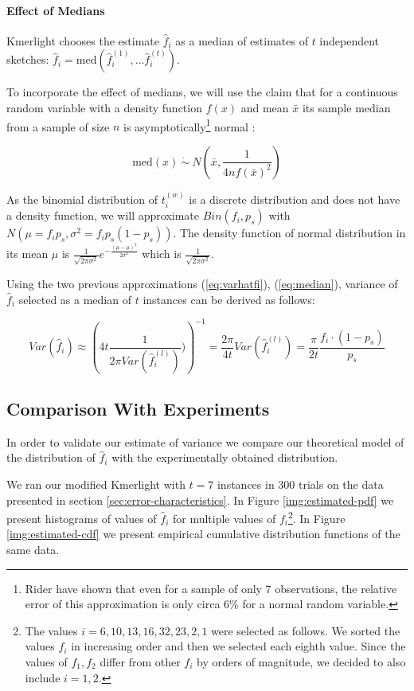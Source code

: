 \paragraph{Effect of Medians}
Kmerlight chooses the estimate $\hat f_i$ as a median of estimates of $t$ 
independent sketches: $\hat f_i = \mathrm{med}(\hat f_i^{(1)}, \dots \hat f_i^{(t)})$.

To incorporate the effect of medians, we will use the claim that for a continuous random
variable with a density function $f(x)$ and mean $\bar x$ its sample median from a sample of
size $n$ is asymptotically\footnote{Rider \cite{Rider1960} have shown that 
even for a sample of only $7$ observations, the relative error of this approximation is only
circa 6\% for a normal random variable.} normal \cite{WikiMedian}:

\begin{equation} \label{eq:median}
\mathrm{med}(x) ~\dot\sim~ N\left(\bar x, \frac{1}{4nf(\bar x)^2}\right)
\end{equation}

As the binomial distribution of $t_i^{(w)}$ is a discrete distribution and does
not have a density function, we will approximate $Bin(f_i, p_s)$ with
$N(\mu = f_i p_s, \sigma^2 = f_i p_s(1-p_s))$. The density function of normal distribution
in its mean $\mu$ is $\frac{1}{\sqrt{2\pi\sigma^2}} e^{-\frac{(\mu - \mu)^2}{2\sigma^2}}$
which is $\frac{1}{\sqrt{2\pi\sigma^2}}$.

Using the two previous approximations (\ref{eq:varhatfi}), (\ref{eq:median}), 
variance of $\hat f_i$ selected as a median of $t$ instances can be derived as follows:

\begin{equation} \label{eq:variance}
Var(\hat f_i) \approx \left( 4t\frac{1}{2\pi Var(\hat f_i^{(l)})}) \right)^{-1} =
\frac{2\pi}{4t} Var(\hat f_i^{(l)}) = \frac{\pi}{2t} \frac{f_i \cdot (1 - p_s)}{p_s}
\end{equation}


\subsection{Comparison With Experiments}
In order to validate our estimate of variance we compare our theoretical model of the distribution 
of $\hat f_i$ with the experimentally obtained distribution.

We ran our modified Kmerlight with $t=7$ instances in 300 trials on the data presented in 
section \ref{sec:error-characteristics}. In Figure \ref{img:estimated-pdf}
we present histograms of values of $\hat f_i$ for multiple values of $f_i$\footnote{
The values $i = 6,10,13,16,32,23,2,1$ were selected as follows. We sorted the values 
$f_i$ in increasing order and then we selected each eighth value. Since the values of
$f_1, f_2$ differ from other $f_i$ by orders of magnitude, we decided to also include $i=1,2$.}.
In Figure \ref{img:estimated-cdf} we present empirical cumulative distribution functions
of the same data. 

